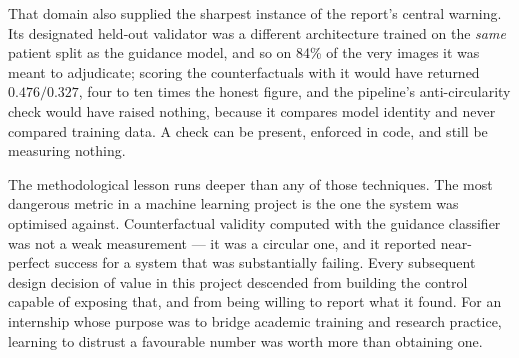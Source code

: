 That domain also supplied the sharpest instance of the report's central
warning. Its designated held-out validator was a different architecture
trained on the \emph{same} patient split as the guidance model, and so on
84\% of the very images it was meant to adjudicate; scoring the
counterfactuals with it would have returned $0.476/0.327$, four to ten
times the honest figure, and the pipeline's anti-circularity check would
have raised nothing, because it compares model identity and never compared
training data. A check can be present, enforced in code, and still be
measuring nothing.

The methodological lesson runs deeper than any of those techniques. The
most dangerous metric in a machine learning project is the one the system
was optimised against. Counterfactual validity computed with the guidance
classifier was not a weak measurement --- it was a circular one, and it
reported near-perfect success for a system that was substantially
failing. Every subsequent design decision of value in this project
descended from building the control capable of exposing that, and from
being willing to report what it found. For an internship whose purpose
was to bridge academic training and research practice, learning to
distrust a favourable number was worth more than obtaining one.

\clearpage
